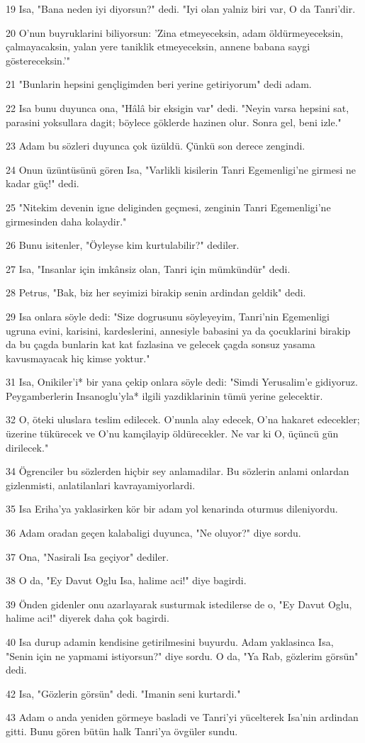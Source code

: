 \par 19 Isa, "Bana neden iyi diyorsun?" dedi. "Iyi olan yalniz biri var, O da Tanri'dir.
\par 20 O'nun buyruklarini biliyorsun: 'Zina etmeyeceksin, adam öldürmeyeceksin, çalmayacaksin, yalan yere taniklik etmeyeceksin, annene babana saygi göstereceksin.'"
\par 21 "Bunlarin hepsini gençligimden beri yerine getiriyorum" dedi adam.
\par 22 Isa bunu duyunca ona, "Hâlâ bir eksigin var" dedi. "Neyin varsa hepsini sat, parasini yoksullara dagit; böylece göklerde hazinen olur. Sonra gel, beni izle."
\par 23 Adam bu sözleri duyunca çok üzüldü. Çünkü son derece zengindi.
\par 24 Onun üzüntüsünü gören Isa, "Varlikli kisilerin Tanri Egemenligi'ne girmesi ne kadar güç!" dedi.
\par 25 "Nitekim devenin igne deliginden geçmesi, zenginin Tanri Egemenligi'ne girmesinden daha kolaydir."
\par 26 Bunu isitenler, "Öyleyse kim kurtulabilir?" dediler.
\par 27 Isa, "Insanlar için imkânsiz olan, Tanri için mümkündür" dedi.
\par 28 Petrus, "Bak, biz her seyimizi birakip senin ardindan geldik" dedi.
\par 29 Isa onlara söyle dedi: "Size dogrusunu söyleyeyim, Tanri'nin Egemenligi ugruna evini, karisini, kardeslerini, annesiyle babasini ya da çocuklarini birakip da bu çagda bunlarin kat kat fazlasina ve gelecek çagda sonsuz yasama kavusmayacak hiç kimse yoktur."
\par 31 Isa, Onikiler'i* bir yana çekip onlara söyle dedi: "Simdi Yerusalim'e gidiyoruz. Peygamberlerin Insanoglu'yla* ilgili yazdiklarinin tümü yerine gelecektir.
\par 32 O, öteki uluslara teslim edilecek. O'nunla alay edecek, O'na hakaret edecekler; üzerine tükürecek ve O'nu kamçilayip öldürecekler. Ne var ki O, üçüncü gün dirilecek."
\par 34 Ögrenciler bu sözlerden hiçbir sey anlamadilar. Bu sözlerin anlami onlardan gizlenmisti, anlatilanlari kavrayamiyorlardi.
\par 35 Isa Eriha'ya yaklasirken kör bir adam yol kenarinda oturmus dileniyordu.
\par 36 Adam oradan geçen kalabaligi duyunca, "Ne oluyor?" diye sordu.
\par 37 Ona, "Nasirali Isa geçiyor" dediler.
\par 38 O da, "Ey Davut Oglu Isa, halime aci!" diye bagirdi.
\par 39 Önden gidenler onu azarlayarak susturmak istedilerse de o, "Ey Davut Oglu, halime aci!" diyerek daha çok bagirdi.
\par 40 Isa durup adamin kendisine getirilmesini buyurdu. Adam yaklasinca Isa, "Senin için ne yapmami istiyorsun?" diye sordu. O da, "Ya Rab, gözlerim görsün" dedi.
\par 42 Isa, "Gözlerin görsün" dedi. "Imanin seni kurtardi."
\par 43 Adam o anda yeniden görmeye basladi ve Tanri'yi yücelterek Isa'nin ardindan gitti. Bunu gören bütün halk Tanri'ya övgüler sundu.

